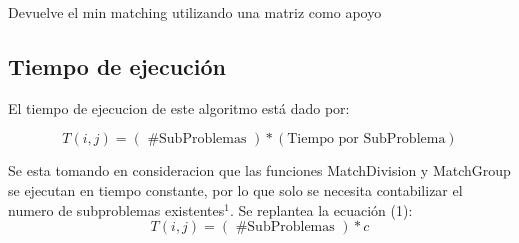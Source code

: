 \documentclass{article}
\begin{document}
\newpage
\begin{algorithm}
\caption{Devuelve el min matching utilizando una matriz como apoyo}
\begin{algorithmic}[1]
    \EndIf
    
    
    \Else
    \EndIf
    \EndFor
    
    \EndIf
    \EndFor
    
    
\EndProcedure
\end{algorithmic}
\end{algorithm}

\subsection{Tiempo de ejecución}

El tiempo de ejecucion de este algoritmo está dado por:

\begin{equation}
T(i,j) = ( \text{ \# SubProblemas } ) * ( \text{Tiempo por SubProblema} )  
\end{equation}

Se esta tomando en consideracion que las funciones MatchDivision y MatchGroup se ejecutan en tiempo constante, por lo que solo se necesita contabilizar el numero de subproblemas existentes$^1$. Se replantea la ecuación (1):
\begin{equation}
T(i,j) = ( \text{ \# SubProblemas } ) * c
\end{equation}  
\end{document}
